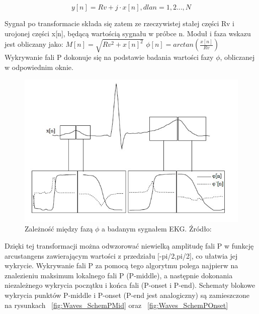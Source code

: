 \begin{equation} \label{eq:Waves_yN}
y[n]=Rv+j \cdot x[n], dla n=1,2...,N
\end{equation}

Sygnał po transformacie składa się zatem ze rzeczywistej stałej części Rv i urojonej części x[n], będącą wartością sygnału w próbce n. Moduł i faza wskazu jest obliczany jako: \newline
$M[n]=\sqrt{Rv^2+x[n]^2}$ \newline
$\phi [n]= arctan(\frac{x[n]}{Rv})$ \newline
Wykrywanie fali P dokonuje się na podstawie badania wartości fazy $\phi$, obliczanej w odpowiednim oknie.

\begin{figure}[h]
\centering
\includegraphics[width=\textwidth,keepaspectratio] {Waves/img/dzialania_fazowej.jpg}
\caption{Zależność między fazą $\phi$ a badanym sygnałem EKG. Źródło: \cite{Waves_aNMfADoEFPBotPT}  }
\label{fig:Waves_DzialFaz}
\end{figure}

Dzięki tej transformacji można odwzorować niewielką amplitudę fali P w funkcję arcustangens zawierającym wartości z przedziału [-pi/2,pi/2], co ułatwia jej wykrycie. Wykrywanie fali P za pomocą tego algorytmu polega najpierw na znalezieniu maksimum lokalnego fali P (P-middle), a następnie dokonania niezależnego wykrycia początku i końca fali (P-onset i P-end). Schematy blokowe wykrycia punktów P-middle i P-onset (P-end jest analogiczny) są zamieszczone na rysunkach ~\ref{fig:Waves_SchemPMid} oraz ~\ref{fig:Waves_SchemPOnset}


